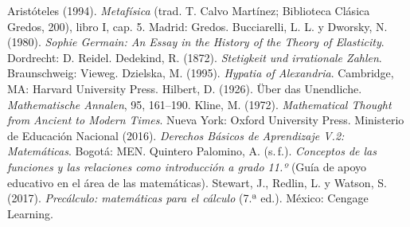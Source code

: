 \documentclass[11pt]{article}
\begin{document}
\begin{referencias}
 Aristóteles (1994). \emph{Metafísica} (trad. T. Calvo
  Martínez; Biblioteca Clásica Gredos, 200), libro I, cap. 5. Madrid: Gredos.
 Bucciarelli, L. L. y Dworsky, N. (1980). \emph{Sophie
  Germain: An Essay in the History of the Theory of Elasticity}. Dordrecht:
  D. Reidel.
 Dedekind, R. (1872). \emph{Stetigkeit und irrationale
  Zahlen}. Braunschweig: Vieweg.
 Dzielska, M. (1995). \emph{Hypatia of Alexandria}.
  Cambridge, MA: Harvard University Press.
 Hilbert, D. (1926). Über das Unendliche. \emph{Mathematische
  Annalen}, 95, 161--190.
 Kline, M. (1972). \emph{Mathematical Thought from Ancient to
  Modern Times}. Nueva York: Oxford University Press.
 Ministerio de Educación Nacional (2016). \emph{Derechos
  Básicos de Aprendizaje V.2: Matemáticas}. Bogotá: MEN.
 Quintero Palomino, A. (s.\,f.). \emph{Conceptos de las funciones
  y las relaciones como introducción a grado 11.º} (Guía de apoyo educativo en el
  área de las matemáticas).
 Stewart, J., Redlin, L. y Watson, S. (2017).
  \emph{Precálculo: matemáticas para el cálculo} (7.ª ed.). México: Cengage Learning.
\end{referencias}
\end{document}
